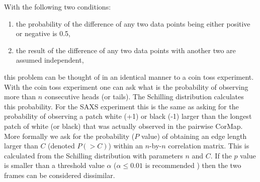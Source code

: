 With the following two conditions:
\begin{enumerate}
    \item the probability of the difference of any two data points being either positive or negative is 0.5,
    \item the result of the difference of any two data points with another two are assumed independent,
\end{enumerate}
this problem can be thought of in an identical manner to a coin toss experiment.
With the coin toss experiment one can ask what is the probability of observing more than $n$ consecutive heads (or tails).
The Schilling distribution \cite{schilling1990longest} calculates this probability.
For the SAXS experiment this is the same as asking for the probability of observing a patch white (+1) or black (-1) larger than the longest patch of white (or black) that was actually observed in the pairwise CorMap.
More formally we ask for the probability ($P$ value) of obtaining an edge length larger than $C$ (denoted $P(>C)$) within an $n$-by-$n$ correlation matrix.
This is calculated from the Schilling distribution with parameters $n$ and $C$.
If the $p$ value is smaller than a threshold value $\alpha$ ($\alpha \le 0.01$ is recommended \cite{franke2015correlation}) then the two frames can be considered dissimilar.

